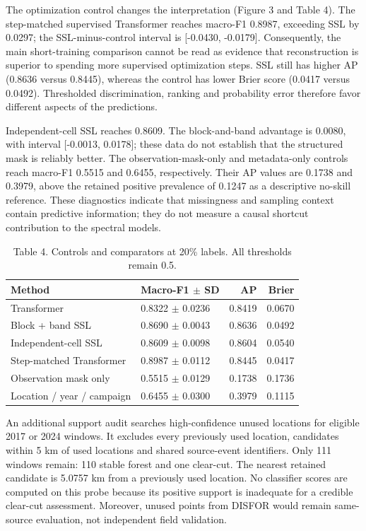 \documentclass[11pt,a4paper]{article}
\begin{document}
The optimization control changes the interpretation (Figure 3 and Table 4). The step-matched supervised Transformer reaches macro-F1 0.8987, exceeding SSL by 0.0297; the SSL-minus-control interval is [-0.0430, -0.0179]. Consequently, the main short-training comparison cannot be read as evidence that reconstruction is superior to spending more supervised optimization steps. SSL still has higher AP (0.8636 versus 0.8445), whereas the control has lower Brier score (0.0417 versus 0.0492). Thresholded discrimination, ranking and probability error therefore favor different aspects of the predictions.

Independent-cell SSL reaches 0.8609. The block-and-band advantage is 0.0080, with interval [-0.0013, 0.0178]; these data do not establish that the structured mask is reliably better. The observation-mask-only and metadata-only controls reach macro-F1 0.5515 and 0.6455, respectively. Their AP values are 0.1738 and 0.3979, above the retained positive prevalence of 0.1247 as a descriptive no-skill reference. These diagnostics indicate that missingness and sampling context contain predictive information; they do not measure a causal shortcut contribution to the spectral models.

\begin{table}[htbp]
\centering

\caption{Table 4. Controls and comparators at 20\% labels. All thresholds remain 0.5.}
\begin{tabular}{llrr}
\toprule
Method & Macro-F1 $\pm$ SD & AP & Brier \\ \midrule
Transformer & 0.8322 $\pm$ 0.0236 & 0.8419 & 0.0670 \\
Block + band SSL & 0.8690 $\pm$ 0.0043 & 0.8636 & 0.0492 \\
Independent-cell SSL & 0.8609 $\pm$ 0.0098 & 0.8604 & 0.0540 \\
Step-matched Transformer & 0.8987 $\pm$ 0.0112 & 0.8445 & 0.0417 \\
Observation mask only & 0.5515 $\pm$ 0.0129 & 0.1738 & 0.1736 \\
Location / year / campaign & 0.6455 $\pm$ 0.0300 & 0.3979 & 0.1115 \\
\bottomrule
\end{tabular}
\end{table}

An additional support audit searches high-confidence unused locations for eligible 2017 or 2024 windows. It excludes every previously used location, candidates within 5 km of used locations and shared source-event identifiers. Only 111 windows remain: 110 stable forest and one clear-cut. The nearest retained candidate is 5.0757 km from a previously used location. No classifier scores are computed on this probe because its positive support is inadequate for a credible clear-cut assessment. Moreover, unused points from DISFOR would remain same-source evaluation, not independent field validation.
\end{document}
